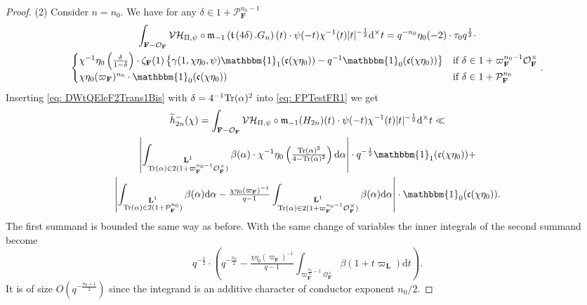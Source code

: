 \documentclass[A4]{amsart}
\numberwithin{equation}{section} \everymath{\displaystyle}
\newcommand{\Tr}{{\rm Tr}}
\newcommand{\id}{\mathbbm{1}}
\newcommand{\ud}{\mathrm{d}}
\newcommand{\F}{\mathbf{F}}
\newcommand{\bL}{\mathbf{L}}
\newcommand{\vO}{\mathcal{O}}
\newcommand{\vP}{\mathcal{P}}
\newcommand{\norm}[1][\cdot]{\lvert #1 \rvert}
\newcommand{\extnorm}[1]{\left\lvert #1 \right\rvert}
\newcommand{\Mult}{\mathfrak{m}}
\newcommand{\VorH}{\mathcal{VH}}
\newcommand{\Trans}{\mathfrak{t}}
\newcommand{\cond}{\mathfrak{c}}
\begin{document}
\begin{proof}
\noindent (2) Consider $n=n_0$. We have for any $\delta \in 1+\vP_{\F}^{n_0-1}$
\begin{multline} \label{eq: DWtQEleF2Trans1Bis}
	\int_{\F-\vO_{\F}} \VorH_{\Pi,\psi} \circ \Mult_{-1} \left( \Trans \left( 4\delta \right).G_n \right)(t) \cdot \psi(-t) \chi^{-1}(t) \norm[t]^{-\frac{1}{2}} \ud^{\times} t = q^{-n_0} \eta_0(-2) \cdot \tau_0 q^{\frac{1}{2}} \cdot \\
	\begin{cases}
		\chi^{-1} \eta_0 \left( \tfrac{\delta}{1-\delta} \right) \cdot \zeta_{\F}(1) \left\{ \gamma(1,\chi \eta_0,\psi) \id_{1}(\cond(\chi \eta_0)) - q^{-1} \id_{0}(\cond(\chi \eta_0)) \right\} & \text{if } \delta \in 1+\varpi_{\F}^{n_0-1} \vO_{\F}^{\times} \\
		\chi\eta_0(\varpi_{\F})^{n_0} \cdot \id_{0}(\cond(\chi \eta_0)) & \text{if } \delta \in 1+\vP_{\F}^{n_0}
	\end{cases}.
\end{multline}
	Inserting \eqref{eq: DWtQEleF2Trans1Bis} with $\delta = 4^{-1} \Tr(\alpha)^2$ into \eqref{eq: FPTestFR1} we get
\begin{multline} \label{eq: h2n-BdRedRBis}
	\widetilde{h}_{2n}^-(\chi) = \int_{\F-\vO_{\F}} \VorH_{\Pi,\psi} \circ \Mult_{-1} (H_{2n})(t) \cdot \psi(-t) \chi^{-1}(t) \norm[t]^{-\frac{1}{2}} \ud^{\times} t \ll \\
	\extnorm{\int_{\substack{\bL^1 \\ \Tr(\alpha) \in 2(1+\varpi_{\F}^{n_0-1} \vO_{\F}^{\times})}} \beta(\alpha) \cdot \chi^{-1} \eta_0 \left( \tfrac{\Tr(\alpha)^2}{4-\Tr(\alpha)^2} \right) \ud \alpha} \cdot q^{-\frac{1}{2}} \id_{1}(\cond(\chi \eta_0)) + \\
	\extnorm{ \int_{\substack{\bL^1 \\ \Tr(\alpha) \in 2(1+\vP_{\F}^{n_0})}} \beta(\alpha) \ud \alpha - \tfrac{\chi\eta_0(\varpi_{\F})^{-1}}{q-1} \int_{\substack{\bL^1 \\ \Tr(\alpha) \in 2(1+\varpi_{\F}^{n_0-1} \vO_{\F}^{\times})}} \beta(\alpha) \ud \alpha } \cdot \id_{0}(\cond(\chi \eta_0)).
\end{multline}
	The first summand is bounded the same way as before. With the same change of variables the inner integrals of the second summand become
	$$ q^{-\frac{1}{2}} \cdot \left( q^{-\frac{n_0}{2}} - \tfrac{\chi\eta_0(\varpi_{\F})^{-1}}{q-1} \int_{\varpi_{\F}^{\frac{n_0}{2}-1}\vO_{\F}^{\times}} \beta(1+t\varpi_{\bL}) \ud t \right). $$
	It is of size $O(q^{-\frac{n_0+1}{2}})$ since the integrand is an additive character of conductor exponent $n_0/2$.
\end{proof}
\end{document}
